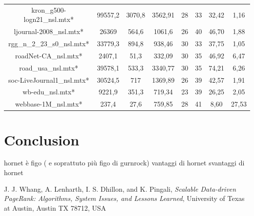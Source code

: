 \documentclass[journal]{IEEEtran}
\begin{document}
\begin{table}[]
\begin{tabular}{|c|c|c|c|c|c|c|c|}
kron\_g500-logn21\_nsl.mtx*  & 99557,2        & 3070,8     & 3562,91     & 28                & 33                 & 32,42              & 1,16                   \\
ljournal-2008\_nsl.mtx*      & 26369          & 564,6      & 1061,6      & 26                & 40                 & 46,70              & 1,88                   \\
rgg\_n\_2\_23\_s0\_nsl.mtx*  & 33779,3        & 894,8      & 938,46      & 30                & 33                 & 37,75              & 1,05                   \\
roadNet-CA\_nsl.mtx*         & 2407,1         & 51,3       & 332,09      & 30                & 35                 & 46,92              & 6,47                   \\
road\_usa\_nsl.mtx*          & 39578,1        & 533,3      & 3340,77     & 30                & 35                 & 74,21              & 6,26                   \\
soc-LiveJournal1\_nsl.mtx*   & 30524,5        & 717        & 1369,89     & 26                & 39                 & 42,57              & 1,91                   \\
wb-edu\_nsl.mtx*             & 9221,9         & 351,3      & 719,34      & 23                & 39                 & 26,25              & 2,05                   \\
webbase-1M\_nsl.mtx*         & 237,4          & 27,6       & 759,85      & 28                & 41                 & 8,60               & 27,53                 \\
\hline
\end{tabular}
\end{table}

\section{Conclusion}
hornet è figo ( e soprattuto più figo di gurnrock)
vantaggi di hornet
svantaggi di hornet

\begin{thebibliography}{1}

J. J. Whang, A. Lenharth, I. S. Dhillon, and K. Pingali, \emph{Scalable Data-driven PageRank: Algorithms, System Issues, and Lessons Learned}, University of Texas at Austin, Austin TX 78712, USA

\end{thebibliography}
\end{document}
